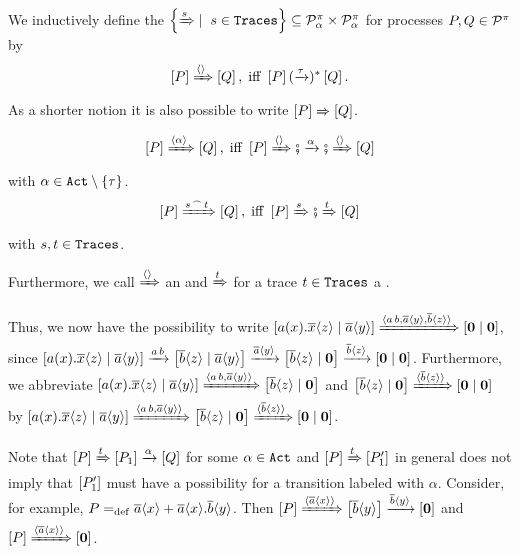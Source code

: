 \begin{definition}
\label{def_bigstep_semantics}
	We inductively define the  $\set[s\in\tr]{\bigstep{s}}\subseteq\procs_\alpha\times\procs_\alpha$ for processes $P,Q\in\mathcal P^{\pi}$ by
		\[\left[P\right]\xRightarrow{\langle\rangle}\left[Q\right],\;\mathrm{iff}\;\left[P\right](\xrightarrow{\tau})^*\left[Q\right].\]
	As a shorter notion it is also possible to write $\left[P\right]\xRightarrow{}\left[Q\right]$.
		\begin{align*}
			\left[P\right]\xRightarrow{\langle\alpha\rangle}\left[Q\right],\;\mathrm{iff}\;\left[P\right]\xRightarrow{\langle\rangle}\fatsemi\xrightarrow{\alpha}\fatsemi\xRightarrow{\langle\rangle}\left[Q\right]
		\end{align*}
	with $\alpha\in\actions\setminus\set{\tau}$.
		\[\left[P\right]\xRightarrow{{s}^{\,\frown{}\,}{t}}\left[Q\right],\;\mathrm{iff}\;\left[P\right]\xRightarrow{s}\fatsemi\xRightarrow{t}\left[Q\right]\]
	with $s,t\in\mathtt{Traces}$.

	Furthermore, we call $\xRightarrow{\langle\rangle{}}$ an  and $\xRightarrow{t}$ for a trace $t\in\mathtt{Traces}$ a .
\end{definition}

Thus, we now have the possibility to write $\left[a(x).\overline{x}\langle z\rangle \mid \overline{a}\langle y\rangle\right]\xRightarrow{\langle a\,b,\overline{a}\langle y\rangle,\overline{b}\langle z\rangle\rangle}\left[\mathbf{0} \mid \mathbf{0}\right]$, since $\left[a(x).\overline{x}\langle z\rangle \mid \overline{a}\langle y\rangle\right]\xrightarrow{a\,b}\left[\overline{b}\langle z\rangle \mid \overline{a}\langle y\rangle\right]\xrightarrow{\overline{a}\langle y\rangle}\left[\overline{b}\langle z\rangle \mid \mathbf{0}\right]\xrightarrow{\overline{b}\langle z\rangle}\left[\mathbf{0} \mid \mathbf{0}\right]$. Furthermore, we abbreviate $\left[a(x).\overline{x}\langle z\rangle \mid \overline{a}\langle y\rangle\right]\xRightarrow{\langle a\,b,\overline{a}\langle y\rangle\rangle}\left[\overline{b}\langle z\rangle \mid \mathbf{0}\right]$ and $\left[\overline{b}\langle z\rangle \mid \mathbf{0}\right]\xRightarrow{\langle\overline{b}\langle z\rangle\rangle}\left[\mathbf{0} \mid \mathbf{0}\right]$ by $\left[a(x).\overline{x}\langle z\rangle \mid \overline{a}\langle y\rangle\right]\xRightarrow{\langle a\,b,\overline{a}\langle y\rangle\rangle}\left[\overline{b}\langle z\rangle \mid \mathbf{0}\right]\xRightarrow{\langle\overline{b}\langle z\rangle\rangle}\left[\mathbf{0} \mid \mathbf{0}\right]$.

Note that $\left[P\right]\xRightarrow{t}\left[P_1\right]\xrightarrow{\alpha}\left[Q\right]$ for some $\alpha\in\mathtt{Act}$ and $\left[P\right]\xRightarrow{t}\left[P_1'\right]$ in general does not imply that $\left[P_1'\right]$ must have a possibility for a transition labeled with $\alpha$. Consider, for example, $P=_{\mathrm{def}}\overline{a}\langle x\rangle + \overline{a}\langle x\rangle.\overline{b}\langle y\rangle$. Then $\left[P\right]\xRightarrow{\langle\overline{a}\langle x\rangle\rangle}\left[\overline{b}\langle y\rangle\right]\xrightarrow{\overline{b}\langle y\rangle}\left[\mathbf{0}\right]$ and $\left[P\right]\xRightarrow{\langle\overline{a}\langle x\rangle\rangle}\left[\mathbf{0}\right]$.
